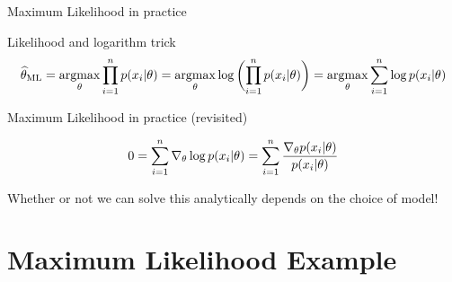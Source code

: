 \documentclass[10pt]{beamer}
\newcommand{\bp}[1]{\bigg(  {#1} \bigg)}
\begin{document}
\begin{frame}{Maximum Likelihood in practice}


\begin{sblock}{Likelihood and logarithm trick}
\[  \widehat{\theta}_{\text{ML}} = \argmax_\theta \ds\prod_{i=1}^n p(x_i | \theta) = \argmax_\theta \log \bp{ \ds\prod_{i=1}^n p(x_i | \theta)} = \argmax_\theta \ds\sum_{i=1}^n \log p(x_i | \theta)  \]
\end{sblock}

\begin{sblock}{Maximum Likelihood in practice (revisited)}

\[ 0 = \displaystyle\sum_{i=1}^n \nabla_\theta \log p(x_i | \theta) = \displaystyle\sum_{i=1}^n \displaystyle\frac{\nabla_\theta p(x_i |\theta) }{p(x_i |\theta)} \]

Whether or not we can solve this analytically depends on the choice of model!
\end{sblock}

\end{frame}


\section{Maximum Likelihood Example}
\end{document}
